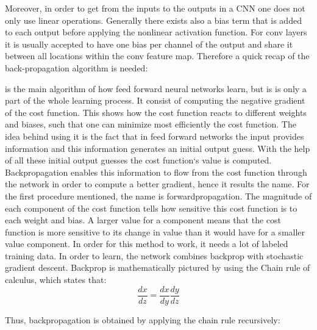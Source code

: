 \documentclass[12pt,a4paper,twoside]{report}
\begin{document}
Moreover, in order to get from the inputs to the outputs in a CNN one does not only use linear operations. Generally there exists also a bias term that is added to each output before applying the nonlinear activation function. For conv layers it is usually accepted to have one bias per channel of the output and share it between all locations within the conv feature map. Therefore a quick recap of the back-propagation algorithm is needed:\par

 is the main algorithm of how feed forward neural networks learn, but is is only a part of the whole learning process. It consist of computing the negative gradient of the cost function. This shows how the cost function reacts to different weights and biases, such that one can minimize most efficiently the cost function. The idea behind using it is the fact that in feed forward networks the input provides information and this information generates an initial output guess. With the help of all these initial output guesses the cost function`s value is computed. Backpropagation enables this information to flow from the cost function through the network in order to compute a better gradient, hence it results the name. For the first procedure mentioned, the name is forwardpropagation. The magnitude of each component of the cost function tells how sensitive this cost function is to each weight and bias. A larger value for a component means that the cost function is more sensitive to its change in value than it would have for a smaller value component. In order for this method to work, it needs a lot of labeled training data. In order to learn, the network combines backprop with stochastic gradient descent.
Backprop is mathematically pictured by using the Chain rule of calculus, which states that:
\begin{equation}
    \frac{dx}{dz}=\frac{dx}{dy}\frac{dy}{dz}
\end{equation}

Thus, backpropagation is obtained by applying the chain rule recursively:
\end{document}
